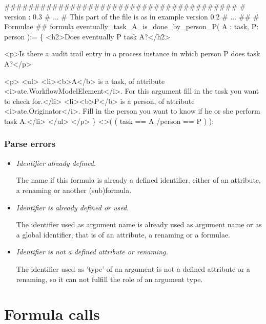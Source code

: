 \begin{ltlcode}
#######################################
# version : 0.3
# ... 
# This part of the file is as in example version 0.2
# ...
##
# Formulae
##
formula eventually_task_A_is_done_by_person_P( A : task, P: person ):=
\{
  <h2>Does eventually P task A?</h2>

    <p>Is there a audit trail entry in a process instance in which person P
    does task A?</p>

    <p>
      <ul>
        <li><b>A</b> is a task, of attribute <i>ate.WorkflowModelElement</i>.
        For this argument fill in the task you want to check for.</li>
        <li><b>P</b> is a person, of attribute <i>ate.Originator</i>. Fill in
        the person you want to know if he or she perform task A.</li>
      </ul>
    </p>
\}
  <>( ( task == A /\bs person == P ) );
\end{ltlcode}

\subsubsection{Parse errors}

\begin{itemize}

   \item  \textit{Identifier already defined.}
   
   The name if this formula is already a defined identifier, either of an
   attribute, a renaming or another (sub)formula.

   \item \textit{Identifier is already defined or used.}
   
   The identifier used as argument name is already used as argument name or as
   a global identifier, that is of an attribute, a renaming or a formulae.

   \item \textit{Identifier is not a defined attribute or renaming.}
   
   The identifier used as 'type' of an argument is not a defined attribute or
   a renaming, so it can not fulfill the role of an argument type.

\end{itemize}

\section{Formula calls}
\label{language:formulacalls}

